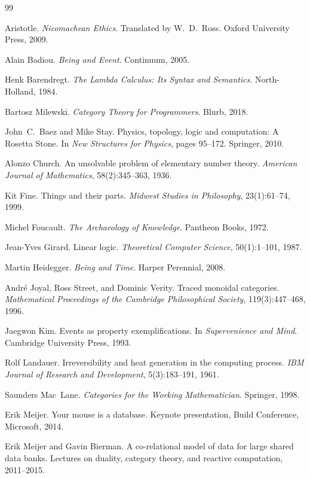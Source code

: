 \documentclass[11pt,a4paper,openany]{book}
\theoremstyle{plain}
\theoremstyle{definition}
\theoremstyle{remark}
\begin{document}
\begin{thebibliography}{99}

Aristotle.
\textit{Nicomachean Ethics}.
Translated by W.~D.~Ross.
Oxford University Press, 2009.

Alain Badiou.
\textit{Being and Event}.
Continuum, 2005.

Henk Barendregt.
\textit{The Lambda Calculus: Its Syntax and Semantics}.
North-Holland, 1984.

Bartosz Milewski.
\textit{Category Theory for Programmers}.
Blurb, 2018.

John~C.\ Baez and Mike Stay.
Physics, topology, logic and computation: A Rosetta Stone.
In \textit{New Structures for Physics}, pages 95--172.
Springer, 2010.

Alonzo Church.
An unsolvable problem of elementary number theory.
\textit{American Journal of Mathematics},
58(2):345--363, 1936.

Kit Fine.
Things and their parts.
\textit{Midwest Studies in Philosophy},
23(1):61--74, 1999.

Michel Foucault.
\textit{The Archaeology of Knowledge}.
Pantheon Books, 1972.

Jean-Yves Girard.
Linear logic.
\textit{Theoretical Computer Science},
50(1):1--101, 1987.

Martin Heidegger.
\textit{Being and Time}.
Harper Perennial, 2008.

Andr\'{e} Joyal, Ross Street, and Dominic Verity.
Traced monoidal categories.
\textit{Mathematical Proceedings of the Cambridge Philosophical Society},
119(3):447--468, 1996.

Jaegwon Kim.
Events as property exemplifications.
In \textit{Supervenience and Mind}.
Cambridge University Press, 1993.

Rolf Landauer.
Irreversibility and heat generation in the computing process.
\textit{IBM Journal of Research and Development},
5(3):183--191, 1961.

Saunders Mac~Lane.
\textit{Categories for the Working Mathematician}.
Springer, 1998.

Erik Meijer.
Your mouse is a database.
Keynote presentation, Build Conference, Microsoft, 2014.

Erik Meijer and Gavin Bierman.
A co-relational model of data for large shared data banks.
Lectures on duality, category theory, and reactive computation, 2011--2015.


\end{thebibliography}
\end{document}
